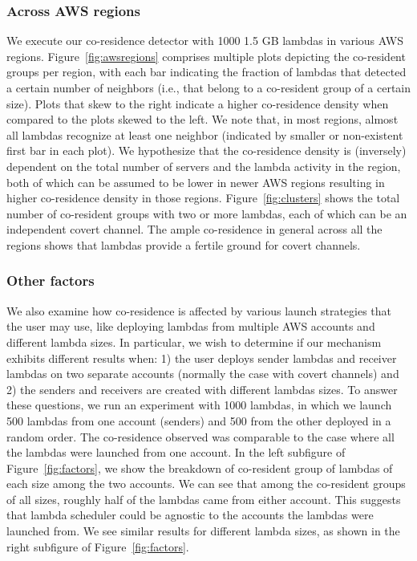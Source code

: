 \subsubsection{Across AWS regions}  
We execute our co-residence detector with 1000 1.5 GB lambdas in various AWS
regions. Figure~\ref{fig:awsregions} comprises multiple plots depicting the
co-resident groups per region, with each bar indicating the fraction of lambdas
that detected a certain number of neighbors (i.e., that belong to a co-resident
group of a certain size). Plots that skew to the right indicate a higher
co-residence density when compared to the plots skewed to the left.  We note
that, in most regions, almost all lambdas recognize at least one neighbor
(indicated by smaller or non-existent first bar in each plot). We hypothesize
that the co-residence density is (inversely) dependent on the total number of
servers and the lambda activity in the region, both of which can be assumed to
be lower in newer AWS regions resulting in higher co-residence density in those
regions. Figure~\ref{fig:clusters} shows the total number of co-resident groups
with two or more lambdas, each of which can be an independent covert channel.
The ample co-residence in general across all the regions shows that lambdas
provide a fertile ground for covert channels.


\subsubsection{Other factors}
We also examine how co-residence is affected by various launch strategies that
the user may use, like deploying lambdas from multiple AWS accounts and
different lambda sizes. In particular, we wish to determine if our mechanism
exhibits different results when: 1) the user deploys sender lambdas and receiver
lambdas on two separate accounts (normally the case with covert channels) and 2)
the senders and receivers are created with different lambdas sizes.  To answer
these questions, we run an experiment with 1000 lambdas, in which we launch 500
lambdas from one account (senders) and 500 from the other deployed in a random
order. The co-residence observed was comparable to the case where all the
lambdas were launched from one account. In the left subfigure of
Figure~\ref{fig:factors}, we show the breakdown of co-resident group of lambdas
of each size among the two accounts.  We can see that among the co-resident
groups of all sizes, roughly half of the lambdas came from either account. This suggests 
that lambda scheduler could be agnostic to the accounts the lambdas were launched
from. We see similar results for different lambda sizes, as shown in the right
subfigure of Figure~\ref{fig:factors}.

